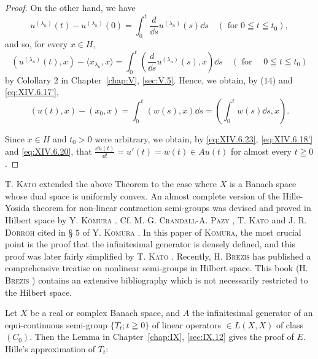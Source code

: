 \begin{proof}
On the other hand, we have 
\[
u ^ {(\lambda_{n})} (t) - u ^ {(\lambda_{n})} (0) = \int_{0} ^{t} \frac {d}{\dd s} u ^ {(\lambda_{n})} (s) \dd s \quad (\text{ for } 0 \leqq t \leqq t _{0}),
\]
and so, for every $x \in H$, 
\[
(u ^ {(\lambda_{n})} (t), x) - \langle x _ {\lambda_{n}}, x \rangle = \int_{0} ^{t} \left(\frac {d}{\dd s} u ^ {(\lambda_{n})} (s), x\right) \dd s \quad (\text{ for } \quad 0 \leqq t \leqq t _{0})
\]
by Colollary $2$ in Chapter~\ref{chap:V}, \ref{sec:V.5}. Hence, we obtain, by ($14$) and \eqref{eq:XIV.6.17'}, 
\begin{equation}\label{eq:XIV.6.23}
(u (t), x) - (x _{0}, x) = \int_{0} ^{t} (w (s), x) \dd s = (\int_{0} ^{t} w (s) \dd s, x).
\end{equation}

Since $x \in H$ and $t_0 > 0$ were arbitrary, we obtain, by \eqref{eq:XIV.6.23}, \eqref{eq:XIV.6.18'} and \eqref{eq:XIV.6.20}, that $\frac{\dd u(t)}{\dd t} = u'(t) = w(t) \in Au(t)$ for almost every $t \geqq 0$. 
\end{proof}

\begin{remarku} T. \textsc{Kato} \cite{kato144} extended the above Theorem to the case where $X$ is a Banach space whose dual space is uniformly convex. An almost complete version of the Hille-Yosida theorem for non-linear contraction semi-groups was devised and proved in Hilbert space by Y. \textsc{Kōmura} \cite{komura159}. Cf. M. G. \textsc{Crandall}-A. \textsc{Pazy} \cite{clarkson36}, T. \textsc{Kato} \cite{kato145} and J. R. \textsc{Dorroh} \cite{doob43} cited in § $5$ of Y. \textsc{Kōmura} \cite{komura159}. In this paper of \textsc{Kōmura}, the most crucial point is the proof that the infinitesimal generator is densely defined, and this proof was later fairly simplified by T. \textsc{Kato} \cite{kato145}. Recently, H. \textsc{Brezis} has published a comprehensive treatise on nonlinear semi-groups in Hilbert space. This book (H. \textsc{Brezis} \cite{brezis28}) contains an extensive bibliography which is not necessarily restricted to the Hilbert space. 
\end{remarku}


\label{sec:XIV.7}

Let $X$ be a real or complex Banach space, and $A$ the infinitesimal generator of an equi-continuous semi-group $\{T_t; t \geqq 0\}$ of linear operators $\in L(X, X)$ of class $(C_0)$. Then the Lemma in Chapter~\ref{chap:IX}, \ref{sec:IX.12} gives the proof of $E$. Hille's approximation of $T_t$: 

